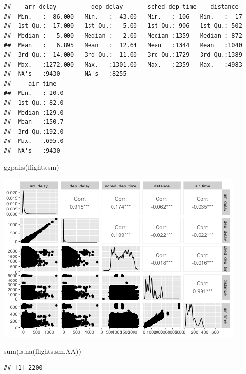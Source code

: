 \documentclass[
]{article}
\newenvironment{Shaded}{\begin{snugshade}}{\end{snugshade}}
\newcommand{\FunctionTok}[1]{\textcolor[rgb]{0.00,0.00,0.00}{#1}}
\newcommand{\NormalTok}[1]{#1}
\begin{document}
\begin{verbatim}
##    arr_delay          dep_delay       sched_dep_time    distance   
##  Min.   : -86.000   Min.   : -43.00   Min.   : 106   Min.   :  17  
##  1st Qu.: -17.000   1st Qu.:  -5.00   1st Qu.: 906   1st Qu.: 502  
##  Median :  -5.000   Median :  -2.00   Median :1359   Median : 872  
##  Mean   :   6.895   Mean   :  12.64   Mean   :1344   Mean   :1040  
##  3rd Qu.:  14.000   3rd Qu.:  11.00   3rd Qu.:1729   3rd Qu.:1389  
##  Max.   :1272.000   Max.   :1301.00   Max.   :2359   Max.   :4983  
##  NA's   :9430       NA's   :8255                                   
##     air_time    
##  Min.   : 20.0  
##  1st Qu.: 82.0  
##  Median :129.0  
##  Mean   :150.7  
##  3rd Qu.:192.0  
##  Max.   :695.0  
##  NA's   :9430
\end{verbatim}

\begin{Shaded}
\begin{Highlighting}[]
\FunctionTok{ggpairs}\NormalTok{(flights.sm)}
\end{Highlighting}
\end{Shaded}

\includegraphics{HW3-Trinath-Sai-Subhash-Reddy-Pittala_files/figure-latex/unnamed-chunk-2-1.png}

\begin{Shaded}
\begin{Highlighting}[]
\FunctionTok{sum}\NormalTok{(}\FunctionTok{is.na}\NormalTok{(flights.sm.AA))}
\end{Highlighting}
\end{Shaded}

\begin{verbatim}
## [1] 2200
\end{verbatim}
\end{document}
